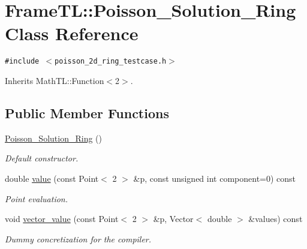 \hypertarget{classFrameTL_1_1Poisson__Solution__Ring}{
\section{FrameTL::Poisson\_\-Solution\_\-Ring Class Reference}
\label{classFrameTL_1_1Poisson__Solution__Ring}
}
{\tt \#include $<$poisson\_\-2d\_\-ring\_\-testcase.h$>$}

Inherits MathTL::Function$<$2$>$.

\subsection*{Public Member Functions}
\begin{CompactItemize}
\item 
\hypertarget{classFrameTL_1_1Poisson__Solution__Ring_9340b045bf0587df6fdc00d7178da302}{
\hyperlink{classFrameTL_1_1Poisson__Solution__Ring_9340b045bf0587df6fdc00d7178da302}{Poisson\_\-Solution\_\-Ring} ()}
\label{classFrameTL_1_1Poisson__Solution__Ring_9340b045bf0587df6fdc00d7178da302}

\begin{CompactList}\small\item\em Default constructor. \item\end{CompactList}\item 
\hypertarget{classFrameTL_1_1Poisson__Solution__Ring_e3fe20619f5529f16fb8d87fe69a860a}{
double \hyperlink{classFrameTL_1_1Poisson__Solution__Ring_e3fe20619f5529f16fb8d87fe69a860a}{value} (const Point$<$ 2 $>$ \&p, const unsigned int component=0) const }
\label{classFrameTL_1_1Poisson__Solution__Ring_e3fe20619f5529f16fb8d87fe69a860a}

\begin{CompactList}\small\item\em Point evaluation. \item\end{CompactList}\item 
\hypertarget{classFrameTL_1_1Poisson__Solution__Ring_2812e1050226b015a28b32b9ef37e0e3}{
void \hyperlink{classFrameTL_1_1Poisson__Solution__Ring_2812e1050226b015a28b32b9ef37e0e3}{vector\_\-value} (const Point$<$ 2 $>$ \&p, Vector$<$ double $>$ \&values) const }
\label{classFrameTL_1_1Poisson__Solution__Ring_2812e1050226b015a28b32b9ef37e0e3}

\begin{CompactList}\small\item\em Dummy concretization for the compiler. \item\end{CompactList}\end{CompactItemize}


